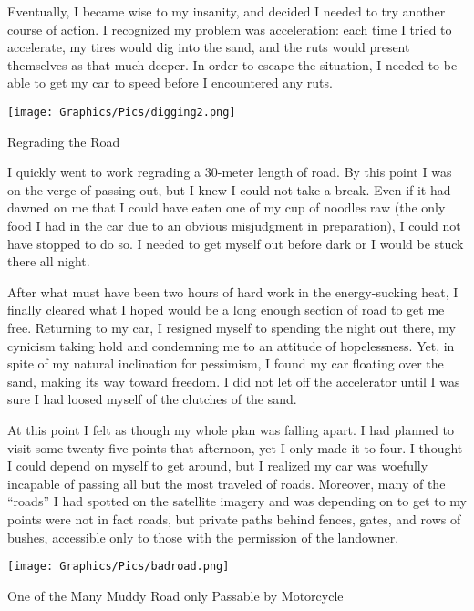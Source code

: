 Eventually, I became wise to my insanity, and decided I needed to try another course of action. I recognized my problem was acceleration: each time I tried to accelerate, my tires would dig into the sand, and the ruts would present themselves as that much deeper. In order to escape the situation, I needed to be able to get my car to speed before I encountered any ruts.

\begin{ssfigure}
  \centering
  \texttt{[image: Graphics/Pics/digging2.png]}
  \caption{Regrading the Road}
  \label{pic:digging2}
\end{ssfigure}

I quickly went to work regrading a 30-meter length of road. By this point I was on the verge of passing out, but I knew I could not take a break. Even if it had dawned on me that I could have eaten one of my cup of noodles raw (the only food I had in the car due to an obvious misjudgment in preparation), I could not have stopped to do so. I needed to get myself out before dark or I would be stuck there all night.

After what must have been two hours of hard work in the energy-sucking heat, I finally cleared what I hoped would be a long enough section of road to get me free. Returning to my car, I resigned myself to spending the night out there, my cynicism taking hold and condemning me to an attitude of hopelessness. Yet, in spite of my natural inclination for pessimism, I found my car floating over the sand, making its way toward freedom. I did not let off the accelerator until I was sure I had loosed myself of the clutches of the sand.

At this point I felt as though my whole plan was falling apart. I had planned to visit some twenty-five points that afternoon, yet I only made it to four. I thought I could depend on myself to get around, but I realized my car was woefully incapable of passing all but the most traveled of roads. Moreover, many of the ``roads'' I had spotted on the satellite imagery and was depending on to get to my points were not in fact roads, but private paths behind fences, gates, and rows of bushes, accessible only to those with the permission of the landowner.

\begin{ssfigure}
  \centering
  \texttt{[image: Graphics/Pics/badroad.png]}
  \caption{One of the Many Muddy Road only Passable by Motorcycle}
  \label{pic:badroad}
\end{ssfigure}


